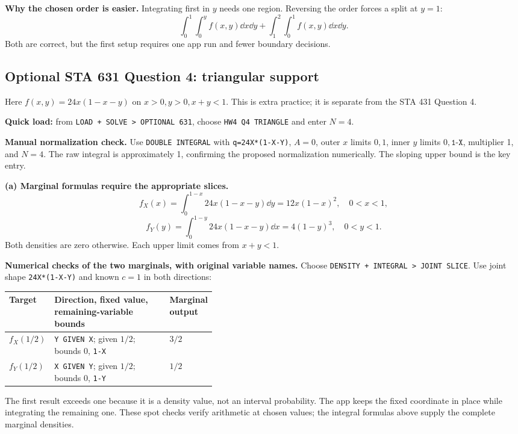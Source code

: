 \textbf{Why the chosen order is easier.} Integrating first in $y$ needs one region. Reversing the order forces a split at $y=1$:
\[
\int_0^1\int_0^y f(x,y)\dd x\dd y
+\int_1^2\int_0^1 f(x,y)\dd x\dd y.
\]
Both are correct, but the first setup requires one app run and fewer boundary decisions.

\clearpage
\subsection{Optional STA 631 Question 4: triangular support}
Here $f(x,y)=24x(1-x-y)$ on $x>0,y>0,x+y<1$. This is extra practice; it is separate from the STA 431 Question 4.

\textbf{Quick load:} from \texttt{LOAD + SOLVE > OPTIONAL 631}, choose \texttt{HW4 Q4 TRIANGLE} and enter $N=4$.\par
\textbf{Manual normalization check.} Use \texttt{DOUBLE INTEGRAL} with \texttt{q=24X*(1-X-Y)}, $A=0$, outer $x$ limits $0,1$, inner $y$ limits $0,\texttt{1-X}$, multiplier 1, and $N=4$. The raw integral is approximately 1, confirming the proposed normalization numerically. The sloping upper bound is the key entry.

\textbf{(a) Marginal formulas require the appropriate slices.}
\[
\boxed{f_X(x)=\int_0^{1-x}24x(1-x-y)\dd y
=12x(1-x)^2,\quad0<x<1,}
\]
\[
\boxed{f_Y(y)=\int_0^{1-y}24x(1-x-y)\dd x
=4(1-y)^3,\quad0<y<1.}
\]
Both densities are zero otherwise. Each upper limit comes from $x+y<1$.

\textbf{Numerical checks of the two marginals, with original variable names.} Choose \texttt{DENSITY + INTEGRAL > JOINT SLICE}. Use joint shape \texttt{24X*(1-X-Y)} and known $c=1$ in both directions:
\begin{center}
\begin{tabularx}{\linewidth}{@{}p{0.19\linewidth}Xp{0.21\linewidth}@{}}
\toprule Target & Direction, fixed value, remaining-variable bounds & Marginal output\\\midrule
$f_X(1/2)$ & \texttt{Y GIVEN X}; given $1/2$; bounds $0$, \texttt{1-X} & $3/2$\\
$f_Y(1/2)$ & \texttt{X GIVEN Y}; given $1/2$; bounds $0$, \texttt{1-Y} & $1/2$\\\bottomrule
\end{tabularx}
\end{center}
The first result exceeds one because it is a density value, not an interval probability. The app keeps the fixed coordinate in place while integrating the remaining one. These spot checks verify arithmetic at chosen values; the integral formulas above supply the complete marginal densities.

